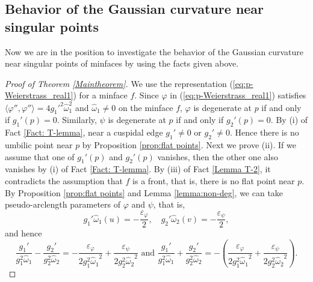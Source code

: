 \documentclass[11pt,reqno]{amsart}
\theoremstyle{plain} %
\theoremstyle{definition}
\begin{document}
\subsection{Behavior of the Gaussian curvature near singular points}
Now we are in the position to investigate the behavior of the Gaussian curvature near singular points of minfaces by using the facts given above. %

\begin{proof}[Proof of Theorem \ref{Maintheorem}]
We use the representation (\ref{eq:p-Weierstrass_real1}) for a minface $f$. Since $\varphi$ in (\ref{eq:p-Weierstrass_real1}) satisfies $\langle \varphi'', \varphi'' \rangle =4{g_1'}^2\hat{\omega}_1^2$ and $\hat{\omega}_1\neq 0$ on the minface $f$, $\varphi$ is degenerate at $p$ if and only if $g_1'(p)=0$. Similarly, $\psi$ is degenerate at $p$ if and only if $g_2'(p)=0$. By (i) of Fact \ref{Fact: T-lemma}, near a cuspidal edge $g_1'\neq 0$ or  $g_2'\neq 0$. Hence there is no umbilic point near $p$ by Proposition \ref{prop:flat points}. Next we prove (ii). If we assume that one of $g_1'(p)$ and $g_2'(p)$ vanishes, then the other one also vanishes by (i) of Fact \ref{Fact: T-lemma}. By (iii) of Fact \ref{Lemma T-2}, it contradicts  the assumption that $f$ is a front, that is, there is no flat point near $p$. By Proposition \ref{prop:flat points} and Lemma \ref{lemma:non-deg}, we can take pseudo-arclength parameters of $\varphi$ and $\psi$, that is, 
\begin{equation}\label{eq: pseudo-arc}
g_1'\hat{\omega}_1(u)=-\frac{\varepsilon_\varphi}{2}, \quad g_2'\hat{\omega}_2(v)=-\frac{\varepsilon_\psi}{2},
\end{equation} 
and hence 
\begin{equation}\label{eq: two discriminants}
\frac{g_1'}{g_1^2\hat{\omega}_1}-\frac{g_2'}{g_2^2\hat{\omega}_2}=-\frac{\varepsilon_\varphi}{2g_1^2{\hat{\omega}_1}^2}+\frac{\varepsilon_\psi}{2g_2^2{\hat{\omega}_2}^2} \text{\ and\ }  \frac{g_1'}{g_1^2\hat{\omega}_1}+\frac{g_2'}{g_2^2\hat{\omega}_2}=-\left(\frac{\varepsilon_\varphi}{2g_1^2{\hat{\omega}_1}^2}+\frac{\varepsilon_\psi}{2g_2^2{\hat{\omega}_2}^2}\right).
\end{equation}

\end{proof}
\end{document}
